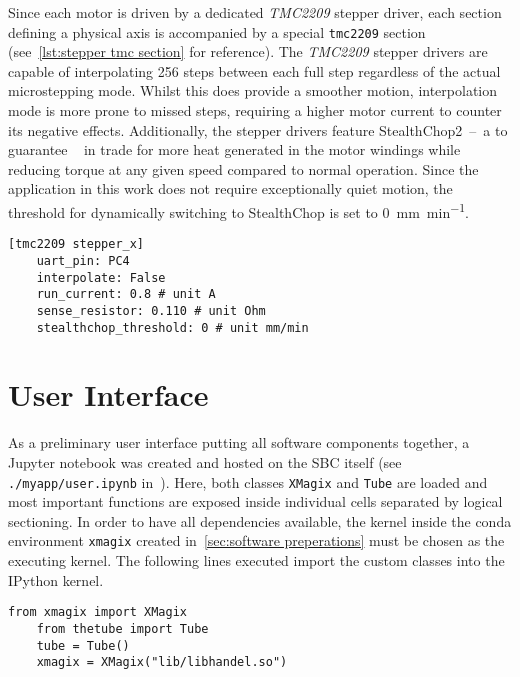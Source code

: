         Since each motor is driven by a dedicated \textit{TMC2209} stepper driver, each section defining a physical axis is accompanied by a special \texttt{tmc2209} section (see~\cref{lst:stepper tmc section} for reference).
        The \textit{TMC2209} stepper drivers are capable of interpolating 256 steps between each full step regardless of the actual microstepping mode.
        Whilst this does provide a smoother motion, interpolation mode is more prone to missed steps, requiring a higher motor current to counter its negative effects.
        Additionally, the stepper drivers feature StealthChop2~--~a  to guarantee ~\cite{Manual.TMC2209Datasheet} in trade for more heat generated in the motor windings while reducing torque at any given speed compared to normal operation.
        Since the application in this work does not require exceptionally quiet motion, the threshold for dynamically switching to StealthChop is set to \qty{0}{\milli\metre\per\minute}.
        \begin{lstlisting}[style=mydjango, firstnumber=31,
            caption={[Stepper corresponding stepper driver section of \texttt{printer.cfg}]Stepper corresponding stepper driver section of \texttt{printer.cfg}.},
            label={lst:stepper tmc section}%
            ]
    [tmc2209 stepper_x]
    uart_pin: PC4
    interpolate: False
    run_current: 0.8 # unit A
    sense_resistor: 0.110 # unit Ohm
    stealthchop_threshold: 0 # unit mm/min
        \end{lstlisting}

    \clearpage
    \section{User Interface}\label{sec:user interface}
        As a preliminary user interface putting all software components together, a Jupyter notebook was created and hosted on the SBC itself (see \texttt{./myapp/user.ipynb} in~\cite{Software.XraythesisHandel.2023}).
        Here, both classes \texttt{XMagix} and \texttt{Tube} are loaded and most important functions are exposed inside individual cells separated by logical sectioning.
        In order to have all dependencies available, the kernel inside the conda environment \texttt{xmagix} created in~\cref{sec:software preperations} must be chosen as the executing kernel.
        The following lines executed import the custom classes into the IPython kernel.
        \begin{lstlisting}[style=mypython, firstnumber=auto]
    from xmagix import XMagix
    from thetube import Tube
    tube = Tube()
    xmagix = XMagix("lib/libhandel.so")
        \end{lstlisting}

